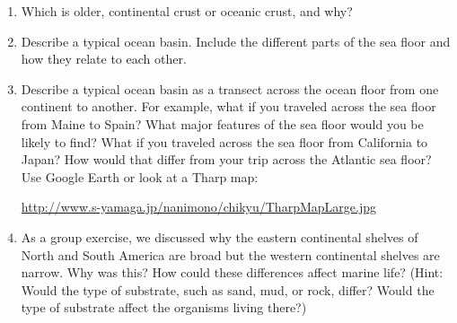 \documentclass[nofonts, letterpaper]{tufte-handout}
\begin{document}
\begin{enumerate}
\item Which is older, continental crust or oceanic crust, and why?



\item Describe a typical ocean basin.  Include the different parts of the sea floor and how they relate to each other.   

\item Describe a typical ocean basin as a transect across the ocean floor from one continent to another.  For example, what if you traveled across the sea floor from Maine to Spain?  What major features of the sea floor would you be likely to find?  What if you traveled across the sea floor from California to Japan? How would that differ from your trip across the Atlantic sea floor?  Use Google Earth or look at a Tharp map: 

\url{http://www.s-yamaga.jp/nanimono/chikyu/TharpMapLarge.jpg}

\item As a group exercise, we discussed why the eastern continental shelves of North and South America are broad but the western continental shelves are narrow.  Why was this?  How could these differences affect marine life? (Hint: Would the type of substrate, such as sand, mud, or rock, differ?  Would the type of substrate affect the organisms living there?)  

\end{enumerate}
\end{document}
